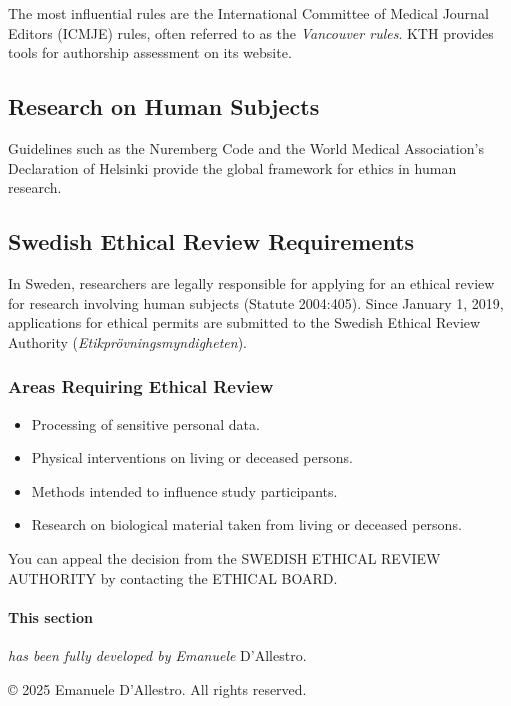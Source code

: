 \documentclass{article}
\begin{document}
The most influential rules are the International Committee of Medical Journal Editors (ICMJE) rules, often referred to as the \textit{Vancouver rules}. KTH provides tools for authorship assessment on its website.

\subsection{Research on Human Subjects}\label{sec:human_subjects}

Guidelines such as the Nuremberg Code and the World Medical Association's Declaration of Helsinki provide the global framework for ethics in human research.

\subsection{Swedish Ethical Review Requirements}\label{sec:swedish_ethics}

In Sweden, researchers are legally responsible for applying for an ethical review for research involving human subjects (Statute 2004:405). Since January 1, 2019, applications for ethical permits are submitted to the Swedish Ethical Review Authority (\textit{Etikprövningsmyndigheten}).

\subsubsection{Areas Requiring Ethical Review}\label{sec:human_review_areas}
\begin{itemize}
    \item Processing of sensitive personal data.
    \item Physical interventions on living or deceased persons.
    \item Methods intended to influence study participants.
    \item Research on biological material taken from living or deceased persons.
\end{itemize}

You can appeal the decision from the SWEDISH ETHICAL REVIEW AUTHORITY by contacting the ETHICAL BOARD.

\newpage
\paragraph{This section}\textit{has been fully developed by Emanuele} D'Allestro.

\newpage





\vfill
\centering
\scriptsize © 2025 Emanuele D'Allestro. All rights reserved.
\end{document}
